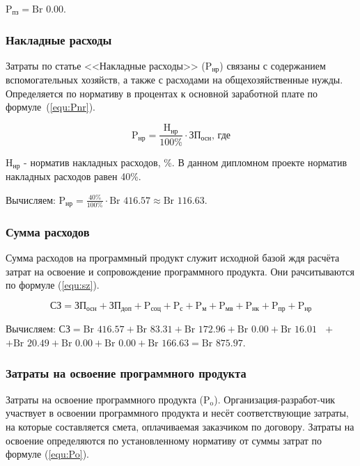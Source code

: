 $\text{P}_\text{пз} = \text{Br }0.00$.

\subsubsection*{Накладные расходы}

Затраты по статье <<Накладные расходы>> ($\text{P}_\text{нр}$) связаны с содержанием вспомогательных хозяйств,
а также с расходами на общехозяйственные нужды.
Определяется по нормативу в процентах к основной заработной плате по формуле~(\ref{equ:Pnr}).

\begin{equation}
    \label{equ:Pnr}
    \text{P}_\text{нр} = \frac{ \text{H}_\text{нр} }{ 100\% } \cdot \text{ЗП}_\text{осн} \text{, где}
\end{equation}

$\text{H}_\text{нр}$ - норматив накладных расходов, \%. В данном дипломном проекте норматив накладных расходов равен 40\%.

Вычисляем: $\text{P}_\text{нр} = \frac{ 40\% }{ 100\% } \cdot \text{Br }416.57 \approx \text{Br }116.63$.

\subsubsection*{Сумма расходов}

Сумма расходов на программный продукт служит исходной базой ждя расчёта затрат на освоение и сопровождение программного продукта.
Они рачситываются по формуле (\ref{equ:sz}).

\begin{equation}
    \label{equ:sz}
    \text{СЗ} = \text{ЗП}_\text{осн} + \text{ЗП}_\text{доп} + \text{P}_\text{соц} + \text{P}_\text{с} + \text{P}_\text{м} + \text{P}_\text{мв}
    + \text{P}_\text{нк} + \text{P}_\text{пр} + \text{P}_\text{нр}
\end{equation}

Вычисляем: $\text{СЗ} = \text{Br }416.57 + \text{Br }83.31 + \text{Br }172.96 + \text{Br }0.00 + \text{Br }16.01 \text{ }+$
$+ \text{Br }20.49 + \text{Br }0.00 + \text{Br }0.00 + \text{Br } 166.63 = \text{Br }875.97$.

\subsubsection*{Затраты на освоение программного продукта}

Затраты на освоение программного продукта ($\text{P}_\text{o}$).
Организация-разработ-чик участвует в освоении программного продукта и несёт соответствующие затраты,
на которые составляется смета, оплачиваемая заказчиком по договору.
Затраты на освоение определяются по установленному нормативу от суммы затрат по формуле (\ref{equ:Po}). 

